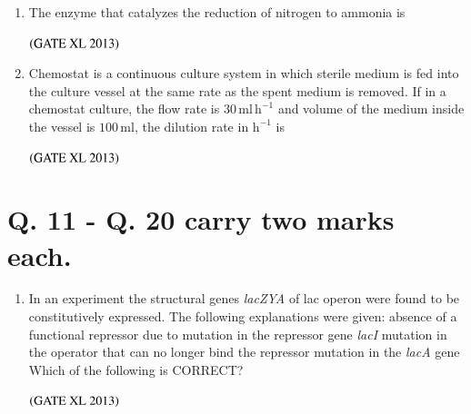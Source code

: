\documentclass[journal]{IEEEtran}
\begin{document}
\begin{enumerate}
\begin{enumerate}[label=\arabic*.]
\item The enzyme that catalyzes the reduction of nitrogen to ammonia is
\begin{enumerate}
\end{enumerate}
\hfill $\left(\text{GATE XL 2013}\right)$

\item Chemostat is a continuous culture system in which sterile medium is fed into the culture vessel at the same rate as the spent medium is removed. If in a chemostat culture, the flow rate is $30\,\text{ml}\,\text{h}^{-1}$ and volume of the medium inside the vessel is $100\,\text{ml}$, the dilution rate in $\text{h}^{-1}$ is
\begin{enumerate}
\end{enumerate}
\hfill $\left(\text{GATE XL 2013}\right)$
\end{enumerate}

\section*{Q. 11 - Q. 20 carry two marks each.}

\begin{enumerate}[label=\arabic*., start=11]
\item In an experiment the structural genes \textit{lacZYA} of lac operon were found to be constitutively expressed. The following explanations were given:  
 absence of a functional repressor due to mutation in the repressor gene \textit{lacI}  
 mutation in the operator that can no longer bind the repressor  
 mutation in the \textit{lacA} gene  
Which of the following is CORRECT?
\begin{enumerate}
\end{enumerate}
\hfill $\left(\text{GATE XL 2013}\right)$


\end{enumerate}
\end{enumerate}
\end{document}
